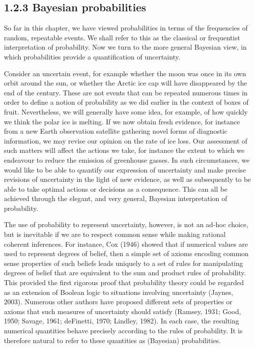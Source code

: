 \documentclass[
  10
]{article}
\begin{document}
\subsection{1.2.3 Bayesian probabilities}\label{bayesian-probabilities}

So far in this chapter, we have viewed probabilities in terms of the
frequencies of random, repeatable events. We shall refer to this as the
classical or frequentist interpretation of probability. Now we turn to
the more general Bayesian view, in which probabilities provide a
quantification of uncertainty.

Consider an uncertain event, for example whether the moon was once in
its own orbit around the sun, or whether the Arctic ice cap will have
disappeared by the end of the century. These are not events that can be
repeated numerous times in order to define a notion of probability as we
did earlier in the context of boxes of fruit. Nevertheless, we will
generally have some idea, for example, of how quickly we think the polar
ice is melting. If we now obtain fresh evidence, for instance from a new
Earth observation satellite gathering novel forms of diagnostic
information, we may revise our opinion on the rate of ice loss. Our
assessment of such matters will affect the actions we take, for instance
the extent to which we endeavour to reduce the emission of greenhouse
gasses. In such circumstances, we would like to be able to quantify our
expression of uncertainty and make precise revisions of uncertainty in
the light of new evidence, as well as subsequently to be able to take
optimal actions or decisions as a consequence. This can all be achieved
through the elegant, and very general, Bayesian interpretation of
probability.

The use of probability to represent uncertainty, however, is not an
ad-hoc choice, but is inevitable if we are to respect common sense while
making rational coherent inferences. For instance, Cox (1946) showed
that if numerical values are used to represent degrees of belief, then a
simple set of axioms encoding common sense properties of such beliefs
leads uniquely to a set of rules for manipulating degrees of belief that
are equivalent to the sum and product rules of probability. This
provided the first rigorous proof that probability theory could be
regarded as an extension of Boolean logic to situations involving
uncertainty (Jaynes, 2003). Numerous other authors have proposed
different sets of properties or axioms that such measures of uncertainty
should satisfy (Ramsey, 1931; Good, 1950; Savage, 1961; deFinetti, 1970;
Lindley, 1982). In each case, the resulting numerical quantities behave
precisely according to the rules of probability. It is therefore natural
to refer to these quantities as (Bayesian) probabilities.
\end{document}
